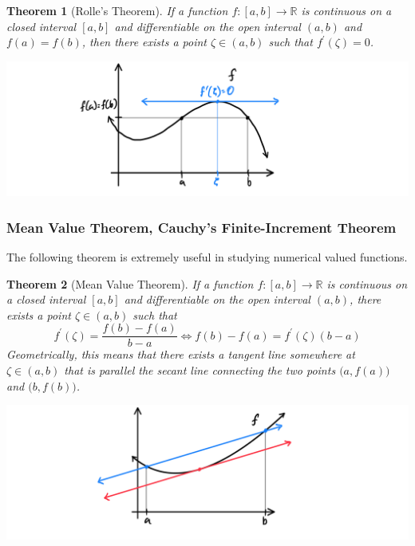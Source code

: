 \documentclass{article}
\newtheorem{theorem}{Theorem}[section]
\theoremstyle{remark}
\theoremstyle{definition}
\begin{document}
\begin{theorem}[Rolle's Theorem]
If a function $f: [a, b] \longrightarrow \mathbb{R}$ is continuous on a closed interval $[a,b]$ and differentiable on the open interval $(a, b)$ and $f(a) = f(b)$, then there exists a point $\zeta \in (a, b)$ such that $f^\prime (\zeta) = 0$. 
\begin{center}
    \includegraphics[scale=0.3]{img/Analysis_Rolles_Theorem.PNG}
\end{center}
\end{theorem}

\subsubsection{Mean Value Theorem, Cauchy's Finite-Increment Theorem}

The following theorem is extremely useful in studying numerical valued functions. 

\begin{theorem}[Mean Value Theorem]
If a function $f: [a,b] \longrightarrow \mathbb{R}$ is continuous on a closed interval $[a,b]$ and differentiable on the open interval $(a, b)$, there exists a point $\zeta \in (a, b)$ such that 
\[f^\prime (\zeta) = \frac{f(b) - f(a)}{b - a} \iff f(b) - f(a) = f^\prime (\zeta) (b-a)\]
Geometrically, this means that there exists a tangent line somewhere at $\zeta \in (a, b)$ that is parallel the secant line connecting the two points $\big(a, f(a)\big)$ and $\big( b, f(b)\big)$. 
\begin{center}
    \includegraphics[scale=0.3]{img/Analysis_Mean_Value_Theorem_Diagram.PNG}
\end{center}
\end{theorem}
\end{document}
